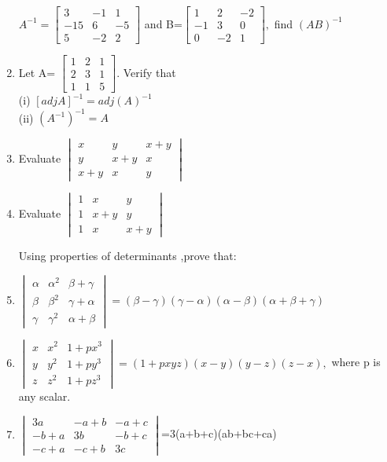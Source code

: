\documentclass[journal,12pt,twocolumn]{IEEEtran}
\renewcommand\thesection{\arabic{section}}
\begin{document}
\begin{enumerate}[label=\thesection.\arabic*.,ref=\thesection.\theenumi]
$A^{-1}=\begin{bmatrix}
3&-1&1 \\ -15&6&-5 \\5&-2&2
\end{bmatrix}$ and B=$\begin{bmatrix}
1&2&-2 \\ -1&3&0 \\0&-2&1
\end{bmatrix},$ find $(AB)^{-1}$\\
\item Let A=
$\begin{bmatrix}
1&2&1 \\ 2&3&1 \\1&1&5
\end{bmatrix}.$ Verify that \\
(i) $[adj A]^{-1}=adj(A)^{-1}$\\
(ii) $(A^{-1})^{-1}=A$\\
\item Evaluate 
$\begin{vmatrix}
x&y&x+y \\ y&x+y&x \\ x+y&x&y
\end{vmatrix}$\\
\solution 

\item Evaluate 
$\begin{vmatrix}
1&x&y \\ 1&x+y&y \\ 1&x&x+y
\end{vmatrix}$
\solution 

Using properties of determinants ,prove that:\\
\item $\begin{vmatrix}
\alpha&\alpha^2&\beta+\gamma \\ \beta&\beta^2&\gamma+\alpha \\ \gamma&\gamma^2&\alpha+\beta
\end{vmatrix}=(\beta-\gamma)(\gamma-\alpha)(\alpha-\beta)(\alpha+\beta+\gamma)$\\
\solution 

\item $\begin{vmatrix}
x&x^2&1+px^3 \\ y&y^2&1+py^3 \\z&z^2&1+pz^3
\end{vmatrix}=(1+pxyz)(x-y)(y-z)(z-x),$ where p is any scalar.\\
\solution 

\item $\begin{vmatrix}
3a&-a+b&-a+c \\ -b+a&3b&-b+c \\ -c+a&-c+b&3c
\end{vmatrix}$=3(a+b+c)(ab+bc+ca)\\
\solution 


\end{enumerate}
 
\end{document}
